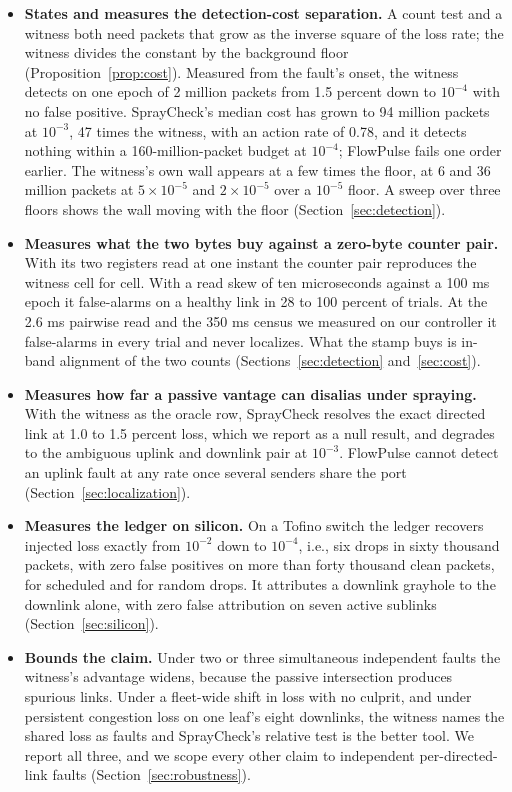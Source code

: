 \begin{itemize}
\item \textbf{States and measures the detection-cost separation.} A count test and a witness both need packets that grow as the inverse square of the loss rate; the witness divides the constant by the background floor (Proposition~\ref{prop:cost}). Measured from the fault's onset, the witness detects on one epoch of 2 million packets from 1.5 percent down to $10^{-4}$ with no false positive. SprayCheck's median cost has grown to 94 million packets at $10^{-3}$, 47 times the witness, with an action rate of 0.78, and it detects nothing within a 160-million-packet budget at $10^{-4}$; FlowPulse fails one order earlier. The witness's own wall appears at a few times the floor, at 6 and 36 million packets at $5\times10^{-5}$ and $2\times10^{-5}$ over a $10^{-5}$ floor. A sweep over three floors shows the wall moving with the floor (Section~\ref{sec:detection}).
\item \textbf{Measures what the two bytes buy against a zero-byte counter pair.} With its two registers read at one instant the counter pair reproduces the witness cell for cell. With a read skew of ten microseconds against a 100 ms epoch it false-alarms on a healthy link in 28 to 100 percent of trials. At the 2.6 ms pairwise read and the 350 ms census we measured on our controller it false-alarms in every trial and never localizes. What the stamp buys is in-band alignment of the two counts (Sections~\ref{sec:detection} and~\ref{sec:cost}).
\item \textbf{Measures how far a passive vantage can disalias under spraying.} With the witness as the oracle row, SprayCheck resolves the exact directed link at 1.0 to 1.5 percent loss, which we report as a null result, and degrades to the ambiguous uplink and downlink pair at $10^{-3}$. FlowPulse cannot detect an uplink fault at any rate once several senders share the port (Section~\ref{sec:localization}).
\item \textbf{Measures the ledger on silicon.} On a Tofino switch the ledger recovers injected loss exactly from $10^{-2}$ down to $10^{-4}$, i.e., six drops in sixty thousand packets, with zero false positives on more than forty thousand clean packets, for scheduled and for random drops. It attributes a downlink grayhole to the downlink alone, with zero false attribution on seven active sublinks (Section~\ref{sec:silicon}).
\item \textbf{Bounds the claim.} Under two or three simultaneous independent faults the witness's advantage widens, because the passive intersection produces spurious links. Under a fleet-wide shift in loss with no culprit, and under persistent congestion loss on one leaf's eight downlinks, the witness names the shared loss as faults and SprayCheck's relative test is the better tool. We report all three, and we scope every other claim to independent per-directed-link faults (Section~\ref{sec:robustness}).

\end{itemize}
